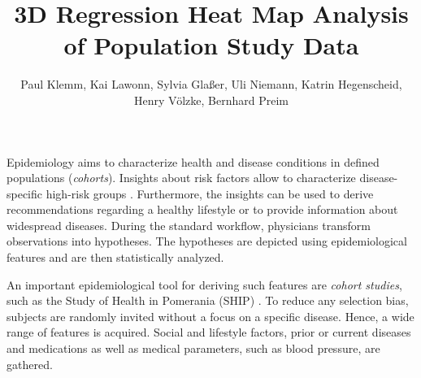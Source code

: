 \documentclass[journal]{style/vgtc} 			          %
\title{3D Regression Heat Map Analysis of Population Study Data}
\author{Paul Klemm, Kai Lawonn, Sylvia Gla{\ss}er, Uli Niemann, Katrin Hegenscheid, Henry V{\"o}lzke, Bernhard Preim}
\begin{document}


\maketitle
Epidemiology aims to characterize health and disease conditions in defined populations (\emph{cohorts}).
Insights about risk factors allow to characterize disease-specific high-risk groups \cite{Fletcher2012}.
Furthermore, the insights can be used to derive recommendations regarding a healthy lifestyle or to provide information about widespread diseases.
During the standard workflow, physicians transform observations into hypotheses.
The hypotheses are depicted using epidemiological features and are then statistically analyzed.

An important epidemiological tool for deriving such features are \emph{cohort studies}, such as the Study of Health in Pomerania (SHIP) \cite{Volzke2011}.
To reduce any selection bias, subjects are randomly invited without a focus on a specific disease.
Hence, a wide range of features is acquired.
%
Social and lifestyle factors, prior or current diseases and medications as well as medical parameters, such as blood pressure, are gathered.
\end{document}
